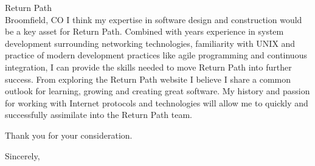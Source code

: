 \documentclass{letter}
\begin{document}
\begin{letter}{Return Path\\Broomfield, CO}
I think my expertise in software design and construction would be
a key asset for Return Path.  Combined with years experience in
system development surrounding networking technologies, familiarity
with UNIX and practice of modern development practices like agile
programming and continuous integration, I can provide the skills
needed to move Return Path into further success.  From exploring
the Return Path website I believe I share a common outlook for
learning, growing and creating great software.  My history and
passion for working with Internet protocols and technologies will
allow me to quickly and successfully assimilate into the Return
Path team.

Thank you for your consideration.

\closing{Sincerely,}
\end{letter}
\end{document}
